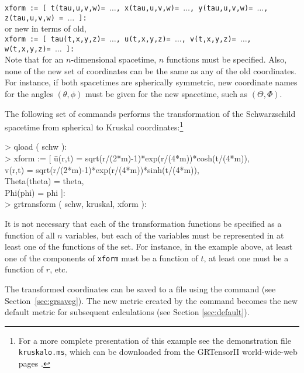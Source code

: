 \documentclass{article}
\begin{document}
\noindent\texttt{xform := [ t(tau,u,v,w)= $\ldots$, x(tau,u,v,w)= $\ldots$,
  y(tau,u,v,w)= $\ldots$, z(tau,u,v,w) = $\ldots$ ]:}\\

\noindent or new in terms of old,\\

\noindent\texttt{xform := [ tau(t,x,y,z)= $\ldots$, u(t,x,y,z)= $\ldots$,
  v(t,x,y,z)= $\ldots$, w(t,x,y,z)= $\ldots$ ]:}\\

\noindent Note that for an $n$-dimensional spacetime, $n$ functions must be 
specified.  Also, none of the new set of coordinates can be the same
as any of the old coordinates. For instance, if both spacetimes are
spherically symmetric, new coordinate names for the angles
$( \theta, \phi )$ must be given for the new spacetime, such as
$( \Theta, \Phi )$.

The following set of commands performs the transformation of the Schwarzschild
spacetime from spherical to Kruskal coordinates:\footnote{For a more complete
presentation of this example see the demonstration file \texttt{kruskalo.ms},
which can be downloaded from the GRTensorII world-wide-web pages \cite{www}.}

\begin{ttfamily}
  \begin{tabbing}
    >  qload ( schw ):\vspace{\baselineskip}\\

    >  xform := [ \= u(r,t) = sqrt(r/(2*m)-1)*exp(r/(4*m))*cosh(t/(4*m)),\\
              \>  v(r,t) = sqrt(r/(2*m)-1)*exp(r/(4*m))*sinh(t/(4*m)),\\
              \>  Theta(theta) = theta,\\
              \>  Phi(phi) = phi ]:\\

    >  grtransform ( schw, kruskal, xform ):
  \end{tabbing}
\end{ttfamily}

It is not necessary that each of the transformation functions be specified 
as a function of all $n$ variables, but each of the variables must be
represented in at least one of the functions of the set. For instance,
in the example above, at least one of the components of \texttt{xform}
must be a function of $t$, at least one must be a function of $r$, etc.

The transformed coordinates can be saved to a file using the
 command (see Section~\ref{sec:grsaveg}). The new metric
created by the  command becomes the new default
metric for subsequent calculations (see Section \ref{sec:default}).
%
\end{document}
